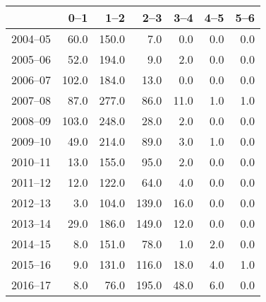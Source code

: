 \begin{table}[ht]
\centering
\begin{tabular}{rrrrrrr}
  \hline
 & 0--1 & 1--2 & 2--3 & 3--4 & 4--5 & 5--6 \\ 
  \hline
2004--05 & 60.0 & 150.0 & 7.0 & 0.0 & 0.0 & 0.0 \\ 
  2005--06 & 52.0 & 194.0 & 9.0 & 2.0 & 0.0 & 0.0 \\ 
  2006--07 & 102.0 & 184.0 & 13.0 & 0.0 & 0.0 & 0.0 \\ 
  2007--08 & 87.0 & 277.0 & 86.0 & 11.0 & 1.0 & 1.0 \\ 
  2008--09 & 103.0 & 248.0 & 28.0 & 2.0 & 0.0 & 0.0 \\ 
  2009--10 & 49.0 & 214.0 & 89.0 & 3.0 & 1.0 & 0.0 \\ 
  2010--11 & 13.0 & 155.0 & 95.0 & 2.0 & 0.0 & 0.0 \\ 
  2011--12 & 12.0 & 122.0 & 64.0 & 4.0 & 0.0 & 0.0 \\ 
  2012--13 & 3.0 & 104.0 & 139.0 & 16.0 & 0.0 & 0.0 \\ 
  2013--14 & 29.0 & 186.0 & 149.0 & 12.0 & 0.0 & 0.0 \\ 
  2014--15 & 8.0 & 151.0 & 78.0 & 1.0 & 2.0 & 0.0 \\ 
  2015--16 & 9.0 & 131.0 & 116.0 & 18.0 & 4.0 & 1.0 \\ 
  2016--17 & 8.0 & 76.0 & 195.0 & 48.0 & 6.0 & 0.0 \\ 
   \hline
\end{tabular}
\end{table}
